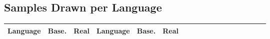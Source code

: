 \documentclass[11pt,letterpaper]{article}
\newcommand{\E}[0]{\mathbb{E}}
\begin{document}






















\subsection{Samples Drawn per Language}

\begin{center}
\begin{longtable}{l|ll||l|llllllllllllll}
	Language & Base. & Real & Language & Base. & Real \\ \hline

\end{longtable}
	\label{tab:samples}
\end{center}
\end{document}
